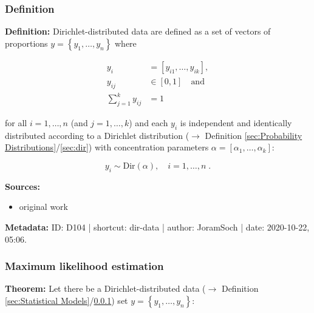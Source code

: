 \documentclass[a4paper,12pt,twoside]{book}
\begin{document}
\subsubsection[\textit{Definition}]{Definition} \label{sec:dir-data}
\setcounter{equation}{0}

\textbf{Definition:} Dirichlet-distributed data are defined as a set of vectors of proportions $y = \left\lbrace y_1, \ldots, y_n \right\rbrace$ where

\begin{equation} \label{eq:dir-data-dir-def}
\begin{split}
y_i &= [y_{i1}, \ldots, y_{ik}], \\
y_{ij} &\in [0,1] \quad \text{and} \\
\sum_{j=1}^k y_{ij} &= 1
\end{split}
\end{equation}

for all $i = 1,\ldots,n$ (and $j = 1,\ldots,k$) and each $y_i$ is independent and identically distributed according to a Dirichlet distribution ($\rightarrow$ Definition \ref{sec:Probability Distributions}/\ref{sec:dir}) with concentration parameters $\alpha = [\alpha_1, \ldots, \alpha_k]$:

\begin{equation} \label{eq:dir-data-dir-data}
y_i \sim \mathrm{Dir}(\alpha), \quad i = 1, \ldots, n \; .
\end{equation}


\vspace{1em}
\textbf{Sources:}
\begin{itemize}
\item original work\end{itemize}


\vspace{1em}
\textbf{Metadata:} ID: D104 | shortcut: dir-data | author: JoramSoch | date: 2020-10-22, 05:06.
\vspace{1em}



\subsubsection[\textbf{Maximum likelihood estimation}]{Maximum likelihood estimation} \label{sec:dir-mle}
\setcounter{equation}{0}

\textbf{Theorem:} Let there be a Dirichlet-distributed data ($\rightarrow$ Definition \ref{sec:Statistical Models}/\ref{sec:dir-data}) set $y = \left\lbrace y_1, \ldots, y_n \right\rbrace$:
\end{document}

